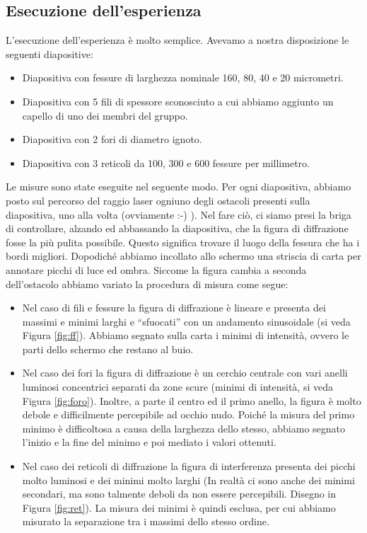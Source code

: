 \subsection{Esecuzione dell'esperienza}

L'esecuzione dell'esperienza è molto semplice. Avevamo a nostra disposizione le seguenti diapositive:

\begin{itemize}
    \item{Diapositiva con fessure di larghezza nominale 160, 80, 40 e 20 micrometri.}
    \item{Diapositiva con 5 fili di spessore sconosciuto a cui abbiamo aggiunto un capello di uno dei membri del gruppo.}
    \item{Diapositiva con 2 fori di diametro ignoto.}
    \item{Diapositiva con 3 reticoli da 100, 300 e 600 fessure per millimetro.}
\end{itemize}

Le misure sono state eseguite nel seguente modo. Per ogni diapositiva, abbiamo posto sul percorso del raggio laser ogniuno degli ostacoli
presenti sulla diapositiva, uno alla volta (ovviamente :-) ). Nel fare ciò, ci siamo presi la briga di controllare, alzando ed abbassando
la diapositiva, che la figura di diffrazione fosse la più pulita possibile. Questo significa trovare il luogo della fessura che ha i bordi
migliori. Dopodiché abbiamo incollato allo schermo una striscia di carta per annotare picchi di luce ed ombra.
Siccome la figura cambia a seconda dell'ostacolo abbiamo variato la procedura di misura come segue:

\begin{itemize}
    \item{Nel caso di fili e fessure la figura di diffrazione è lineare e presenta dei massimi e minimi larghi e ``sfuocati'' con un andamento
        sinusoidale (si veda Figura \ref{fig:ff}). Abbiamo segnato sulla carta i minimi di intensità, ovvero le parti dello schermo
        che restano al buio.}
    \item{Nel caso dei fori la figura di diffrazione è un cerchio centrale con vari anelli luminosi concentrici separati da
        zone scure (minimi di intensità, si veda Figura \ref{fig:foro}). Inoltre, a parte il centro ed il primo anello,
        la figura è molto debole e difficilmente
        percepibile ad occhio nudo. Poiché la misura del primo minimo è difficoltosa a causa della larghezza dello stesso, abbiamo segnato
        l'inizio e la fine del minimo e poi mediato i valori ottenuti.}
    \item{Nel caso dei reticoli di diffrazione la figura di interferenza presenta dei picchi molto luminosi e dei minimi molto larghi
            (In realtà ci sono anche dei minimi secondari, ma sono talmente deboli da non essere percepibili. Disegno in Figura \ref{fig:ret}).
            La misura dei minimi è quindi
        esclusa, per cui abbiamo misurato la separazione tra i massimi dello stesso ordine.}
\end{itemize}

